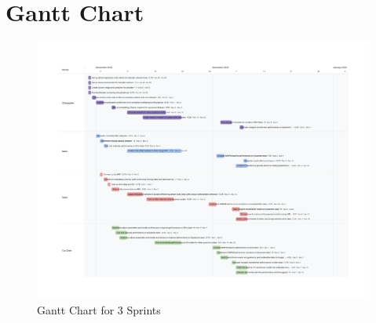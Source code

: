 \documentclass[12pt]{article}
\begin{document}
\section{Gantt Chart}

\begin{figure}[H]
        \centering
        \includegraphics[width=0.75\linewidth]{images/Sprint Backlog.xlsx-GanttTimeline.pdf}
        \caption{Gantt Chart for 3 Sprints}
        \label{fig:4}
\end{figure}
\end{document}
